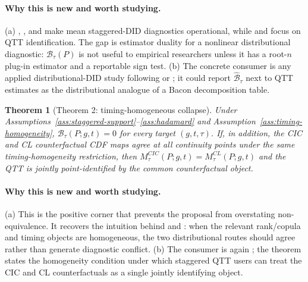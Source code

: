 \documentclass[11pt]{article}
\theoremstyle{definition}
\theoremstyle{plain}
\newtheorem{theorem}{Theorem}
\theoremstyle{remark}
\begin{document}
\paragraph{Why this is new and worth studying.}
(a) \citet{deChaisemartinDHaultfoeuille2020}, \citet{GoodmanBacon2021}, and \citet{SunAbraham2021} make mean staggered-DID diagnostics operational, while \citet{CallawayLi2019} and \citet{LiLin2024} focus on QTT identification.  The gap is estimator duality for a nonlinear distributional diagnostic: \(\mathcal B_\tau(P)\) is not useful to empirical researchers unless it has a root-\(n\) plug-in estimator and a reportable sign test.  (b) The concrete consumer is any applied distributional-DID study following \citet{LiLin2024} or \citet{Ciaccio2025}; it could report \(\widehat{\mathcal B}_\tau\) next to QTT estimates as the distributional analogue of a Bacon decomposition table.

\begin{theorem}[Theorem 2: timing-homogeneous collapse]\label{thm:homogeneous-collapse}
Under Assumptions~\ref{ass:staggered-support}--\ref{ass:hadamard} and Assumption~\ref{ass:timing-homogeneity}, \(\mathcal B_\tau(P;g,t)=0\) for every target \((g,t,\tau)\).  If, in addition, the CIC and CL counterfactual CDF maps agree at all continuity points under the same timing-homogeneity restriction, then \(M_\tau^{CIC}(P;g,t)=M_\tau^{CL}(P;g,t)\) and the QTT is jointly point-identified by the common counterfactual object.
\end{theorem}
\paragraph{Why this is new and worth studying.}
(a) This is the positive corner that prevents the proposal from overstating non-equivalence.  It recovers the intuition behind \citet{AtheyImbens2006} and \citet{CallawayLi2019}: when the relevant rank/copula and timing objects are homogeneous, the two distributional routes should agree rather than generate diagnostic conflict.  (b) The consumer is again \citet{LiLin2024}; the theorem states the homogeneity condition under which staggered QTT users can treat the CIC and CL counterfactuals as a single jointly identifying object.
\end{document}
